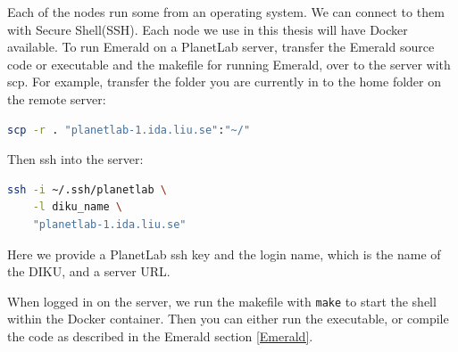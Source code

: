 Each of the nodes run some from an operating system. We can connect to them with Secure Shell(SSH). Each node we use in this thesis will have Docker available. To run Emerald on a PlanetLab server, transfer the Emerald source code or executable and the makefile for running Emerald, over to the server with scp. For example, transfer the folder you are currently in to the home folder on the remote server:
\begin{lstlisting}[language=Bash]
scp -r . "planetlab-1.ida.liu.se":"~/"
\end{lstlisting}
Then ssh into the server: 
\begin{lstlisting}[language=Bash]
ssh -i ~/.ssh/planetlab \
    -l diku_name \
    "planetlab-1.ida.liu.se"
\end{lstlisting}
Here we provide a PlanetLab ssh key and the login name, which is the name of the DIKU, and a server URL.

When logged in on the server, we run the makefile with \verb|make| to start the shell within the Docker container. Then you can either run the executable, or compile the code as described in the Emerald section \ref{Emerald}.




